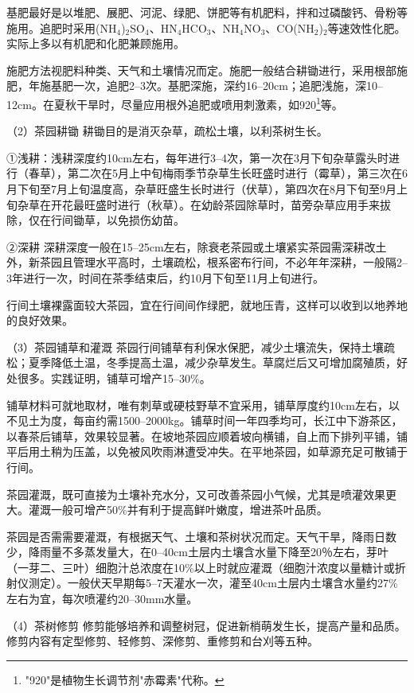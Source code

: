 \documentclass{ctexbook}
\begin{document}
基肥最好是以堆肥、展肥、河泥、绿肥、饼肥等有机肥料，拌和过磷酸钙、骨粉等施用。追肥时采用(NH$_4$)$_2$SO$_4$、HN$_4$HCO$_3$、NH$_4$NO$_3$、CO(NH$_2$)$_2$等速效性化肥。实际上多以有机肥和化肥兼顾施用。

施肥方法视肥料种类、天气和土壤情况而定。施肥一般结合耕锄进行，采用根部施肥，年施基肥一次，追肥2--3次。基肥深施，深约16--20cm；追肥浅施，深10--12cm。在夏秋干旱时，尽量应用根外追肥或喷用刺激素，如920\footnote{"920"是植物生长调节剂"赤霉素"代称。}等。

（2）茶园耕锄 耕锄目的是消灭杂草，疏松土壤，以利茶树生长。

①浅耕：浅耕深度约10cm左右，每年进行3--4次，第一次在3月下旬杂草露头时进行（春草），第二次在5月上中旬梅雨季节杂草生长旺盛时进行（霉草），第三次在6月下旬至7月上旬温度高，杂草旺盛生长时进行（伏草），第四次在8月下旬至9月上旬杂草在开花最旺盛时进行（秋草）。在幼龄茶园除草时，苗旁杂草应用手来拔除，仅在行间锄草，以免损伤幼苗。

②深耕 深耕深度一般在15--25cm左右，除衰老茶园或土壤紧实茶园需深耕改土外，新茶园且管理水平高时，土壤疏松，根系密布行间，不必年年深耕，一般隔2--3年进行一次，时间在茶季结束后，约10月下旬至11月上旬进行。

行间土壤裸露面较大茶园，宜在行间间作绿肥，就地压青，这样可以收到以地养地的良好效果。

（3）茶园铺草和灌溉 茶园行间铺草有利保水保肥，减少土壤流失，保持土壤疏松；夏季降低土温，冬季提高土温，减少杂草发生。草腐烂后又可增加腐殖质，好处很多。实践证明，铺草可增产15--30\%。

铺草材料可就地取材，唯有刺草或硬枝野草不宜采用，铺草厚度约10cm左右，以不见土为度，每亩约需1500--2000kg。铺草时间一年四季均可，长江中下游茶区，以春茶后铺草，效果较显著。在坡地茶园应顺着坡向横铺，自上而下排列平铺，铺平后用土稍为压盖，以免被风吹雨淋遭受冲失。在平地茶园，如草源充足可散铺于行间。

茶园灌溉，既可直接为土壤补充水分，又可改善茶园小气候，尤其是喷灌效果更大。灌溉一般可增产50\%并有利于提高鲜叶嫩度，增进茶叶品质。

茶园是否需需要灌溉，有根据天气、土壤和茶树状况而定。天气干旱，降雨日数少，降雨量不多蒸发量大，在0--40cm土层内土壤含水量下降至20％左右，芽叶（一芽二、三叶）细胞汁总浓度在10\%以上时就应灌溉（细胞汁浓度以量糖计或折射仪测定）。一般伏天早期每5--7天灌水一次，灌至40cm土层内土壤含水量约27\%左右为宜，每次喷灌约20--30mm水量。

（4）茶树修剪 修剪能够培养和调整树冠，促进新梢萌发生长，提高产量和品质。修剪内容有定型修剪、轻修剪、深修剪、重修剪和台刈等五种。
\end{document}
